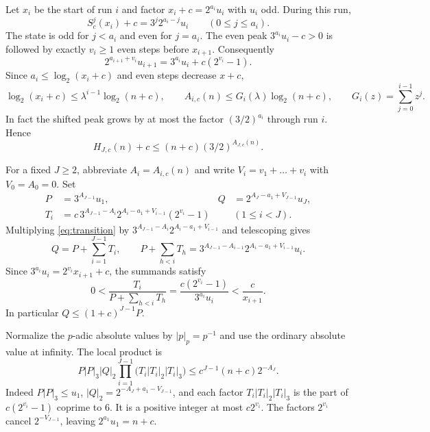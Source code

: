 \documentclass[11pt]{article}
\theoremstyle{definition}
\begin{document}
Let \(x_i\) be the start of run \(i\) and factor
\(x_i+c=2^{a_i}u_i\) with \(u_i\) odd. During this run,
\[
 S_c^j(x_i)+c=3^j2^{a_i-j}u_i \qquad(0\le j\le a_i).
\]
The state is odd for \(j<a_i\) and even for \(j=a_i\).
The even peak \(3^{a_i}u_i-c>0\) is followed by exactly \(v_i\ge1\)
even steps before \(x_{i+1}\). Consequently
\begin{equation}\label{eq:transition}
 2^{a_{i+1}+v_i}u_{i+1}=3^{a_i}u_i+c(2^{v_i}-1).
\end{equation}
Since \(a_i\le\log_2(x_i+c)\) and even steps decrease \(x+c\),
\begin{equation}\label{eq:elementary}
 \log_2(x_i+c)\le\lambda^{i-1}\log_2(n+c),\qquad
 A_{i,c}(n)\le G_i(\lambda)\log_2(n+c),
 \qquad G_i(z)=\sum_{j=0}^{i-1}z^j.
\end{equation}
In fact the shifted peak grows by at most the factor \((3/2)^{a_i}\)
through run \(i\). Hence
\begin{equation}\label{eq:peak-budget}
 H_{J,c}(n)+c\le(n+c)(3/2)^{A_{J,c}(n)} .
\end{equation}

For a fixed \(J\ge2\), abbreviate \(A_i=A_{i,c}(n)\) and write
\(V_i=v_1+\dots+v_i\) with \(V_0=A_0=0\). Set
\begin{align*}
 P&=3^{A_{J-1}}u_1, &
 Q&=2^{A_J-a_1+V_{J-1}}u_J,\\
 T_i&=c\,3^{A_{J-1}-A_i}2^{A_i-a_1+V_{i-1}}(2^{v_i}-1)
       && (1\le i<J).
\end{align*}
Multiplying \eqref{eq:transition} by
\(3^{A_{J-1}-A_i}2^{A_i-a_1+V_{i-1}}\) and telescoping gives
\begin{equation}\label{eq:telescope}
 Q=P+\sum_{i=1}^{J-1}T_i,\qquad
 P+\sum_{h<i}T_h
   =3^{A_{J-1}-A_{i-1}}2^{A_i-a_1+V_{i-1}}u_i .
\end{equation}
Since \(3^{a_i}u_i=2^{v_i}x_{i+1}+c\), the summands satisfy
\begin{equation}\label{eq:ratio}
 0<\frac{T_i}{P+\sum_{h<i}T_h}
   =\frac{c(2^{v_i}-1)}{3^{a_i}u_i}
   <\frac{c}{x_{i+1}}.
\end{equation}
In particular \(Q\le (1+c)^{J-1}P\).

Normalize the \(p\)-adic absolute values by \(|p|_p=p^{-1}\)
and use the ordinary absolute value at infinity. The local product is
\begin{equation}\label{eq:product}
 P|P|_3|Q|_2
 \prod_{i=1}^{J-1}\bigl(T_i|T_i|_2|T_i|_3\bigr)
 \le c^{J-1}(n+c)2^{-A_J}.
\end{equation}
Indeed \(P|P|_3\le u_1\), \(|Q|_2=2^{-A_J+a_1-V_{J-1}}\), and
each factor \(T_i|T_i|_2|T_i|_3\) is the part of \(c(2^{v_i}-1)\)
coprime to \(6\). It is a positive integer at most \(c2^{v_i}\).
The factors \(2^{v_i}\) cancel \(2^{-V_{J-1}}\), leaving
\(2^{a_1}u_1=n+c\).
\end{document}
